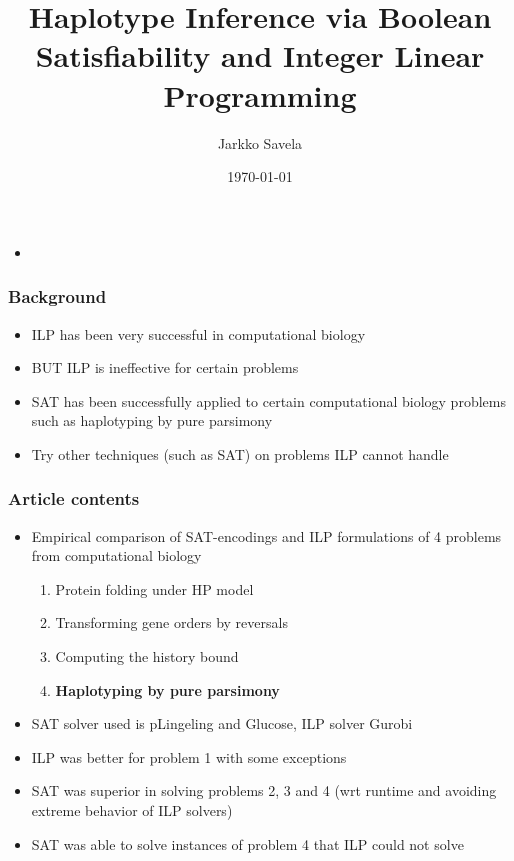 \documentclass[handout]{beamer}
\title[]{Haplotype Inference via Boolean Satisfiability and Integer Linear Programming} %
\author{Jarkko Savela} %
\institute{University of Helsinki} %
\date{\today} %
\begin{document}
\begin{frame}
\titlepage %
\end{frame}

\begin{frame}
\begin{itemize}
\item {}
\end{itemize}
\end{frame}

\begin{frame}
\frametitle{Background}
\begin{itemize}
\item ILP has been very successful in computational biology~\cite{gusfield2019integer}
\item BUT ILP is ineffective for certain problems
\item SAT has been successfully applied to certain computational biology problems such as haplotyping by pure parsimony~\cite{DBLP:conf/aaai/LynceM06, DBLP:journals/anor/GracaMLO11, DBLP:journals/jda/JagerCZ16}
\item Try other techniques (such as SAT) on problems ILP cannot handle
\end{itemize}
\end{frame}

\begin{frame}
\frametitle{Article contents}
\begin{itemize}
\item Empirical comparison of SAT-encodings and ILP formulations of 4 problems from computational biology
\begin{enumerate}
\item Protein folding under HP model
\item Transforming gene orders by reversals
\item Computing the history bound
\item \textbf{Haplotyping by pure parsimony}
\end{enumerate}
\item SAT solver used is pLingeling and Glucose, ILP solver Gurobi
\item ILP was better for problem 1 with some exceptions
\item SAT was superior in solving problems 2, 3 and 4 (wrt runtime and avoiding extreme behavior of ILP solvers)
\item SAT was able to solve instances of problem 4 that ILP could not solve
\end{itemize}
\end{frame}
\end{document}
